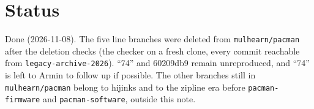 \documentclass[11pt]{article}
\newcommand{\br}[1]{\texttt{#1}}
\newcommand{\h}[1]{\texttt{#1}}
\begin{document}
\section{Status}

Done (2026-11-08).  The five line branches were deleted from \h{mulhearn/pacman} after the deletion checks (the
checker on a fresh clone, every commit reachable from \br{legacy-archive-2026}).  ``74'' and 60209db9 remain
unreproduced, and ``74'' is left to Armin to follow up if possible.  The other branches still in \h{mulhearn/pacman}
belong to hijinks and to the zipline era before \h{pacman-firmware} and \h{pacman-software}, outside this note.
\end{document}
